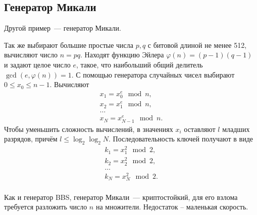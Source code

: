 \subsection{Генератор Микали}

Другой пример~--- генератор Микали.

Так же выбирают большие простые числа $p,q$ с битовой длиной не менее 512, вычисляют число $n = pq$. Находят функцию Эйлера $\varphi(n) = (p-1) (q-1)$ и задают целое число $e$, такое, что наибольший общий делитель $\gcd(e, \varphi(n)) = 1$. С помощью генератора случайных чисел выбирают $0 \leq x_{0} \leq n-1$. Вычисляют
\[ \begin{array}{l}
    x_1 = x_0^e \mod n, \\
    x_2 = x_1^e \mod n, \\
    \dots \\
    x_N = x_{N-1}^e \mod n.
\end{array} \]
Чтобы уменьшить сложность вычислений, в значениях $x_i$ оставляют $l$ младших разрядов, причём $l \leq \log_2 \log_2 N$. Последовательность ключей получают в виде
\[ \begin{array}{l}
    k_1 = x_1^2 \mod 2, \\
    k_2 = x_2^2 \mod 2, \\
    \dots \\
    k_N = x_N^2 \mod 2. \\
\end{array} \]

Как и генератор BBS, генератор Микали~--- криптостойкий, для его взлома требуется разложить число $n$ на множители. Недостаток -- маленькая скорость.
